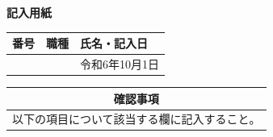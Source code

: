 \documentclass[UTF8,10pt,a4paper,fontset=fandol]{ctexart}
\newcommand{\fieldvalue}[1]{#1}
\begin{document}

\newpage

\begin{center}
\textbf{記入用紙}
\end{center}

\begin{tabularx}{\textwidth}{|l|X|l|}
\hline
番号 & 職種 & 氏名・記入日 \\
\hline
 &  & 
\fieldvalue{令和6年10月1日} \\
\hline
\end{tabularx}

\vspace{0.5em}

\noindent
\begin{tabularx}{\textwidth}{|p{}|X|}
\hline
\multicolumn{2}{|c|}{確認事項} \\
\hline
\multicolumn{2}{|l|}{以下の項目について該当する欄に記入すること。} \\
\hline
\end{tabularx}

\vspace{0.5em}
\end{document}
